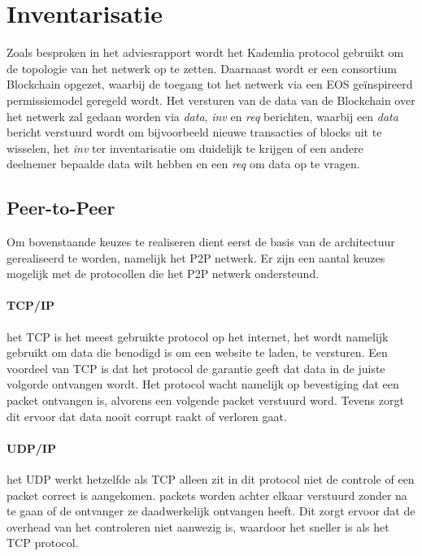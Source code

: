 \section{Inventarisatie}

Zoals besproken in het adviesrapport wordt het Kademlia protocol gebruikt om de topologie van het netwerk op te zetten. Daarnaast wordt er een consortium Blockchain opgezet, waarbij de toegang tot het netwerk via een EOS geïnspireerd permissiemodel geregeld wordt. Het versturen van de data van de Blockchain over het netwerk zal gedaan worden via \textit{data}, \textit{inv} en \textit{req} berichten, waarbij een \textit{data} bericht verstuurd wordt om bijvoorbeeld nieuwe transacties of blocks uit te wisselen, het \textit{inv} ter inventarisatie om duidelijk te krijgen of een andere deelnemer bepaalde data wilt hebben en een \textit{req} om data op te vragen.

\subsection{Peer-to-Peer}
Om bovenstaande keuzes te realiseren dient eerst de basis van de architectuur gerealiseerd te worden, namelijk het \acrfull{P2P} netwerk. Er zijn een aantal keuzes mogelijk met de protocollen die het \acrshort{P2P} netwerk ondersteund.

\paragraph{TCP/IP} het \acrfull{TCP} is het meest gebruikte protocol op het internet, het wordt namelijk gebruikt om data die benodigd is om een website te laden, te versturen. Een voordeel van \acrshort{TCP} is dat het protocol de garantie geeft dat data in de juiste volgorde ontvangen wordt. Het protocol wacht namelijk op bevestiging dat een \gls{packet} ontvangen is, alvorens een volgende \gls{packet} verstuurd word. Tevens zorgt dit ervoor dat data nooit corrupt raakt of verloren gaat.

\paragraph{UDP/IP} het \acrfull{UDP} werkt hetzelfde als \acrshort{TCP} alleen zit in dit protocol niet de controle of een \gls{packet} correct is aangekomen. \Glspl{packet} worden achter elkaar verstuurd zonder na te gaan of de ontvanger ze daadwerkelijk ontvangen heeft. Dit zorgt ervoor dat de overhead van het controleren niet aanwezig is, waardoor het sneller is als het \acrshort{TCP} protocol.


